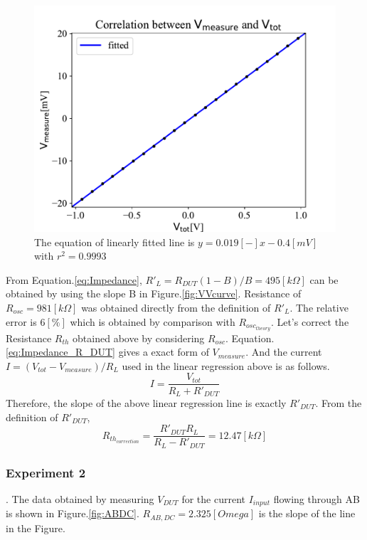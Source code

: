 \documentclass[5p,sort&compress]{elsarticle}
\begin{document}
\begin{figure}[h]
\centering
\includegraphics[width=.5\textwidth]{Impedance_VV.pdf}
\caption{The equation of linearly fitted line is $y = 0.019[-]x - 0.4[mV]$ with $r^2 = 0.9993$}
\label{fig:Impedance_VV}
\end{figure}

From Equation.\ref{eq:Impedance}, $R'_L = R_{DUT}(1-B)/B = 495[k\Omega]$ can be obtained by using the slope B in Figure.\ref{fig:VVcurve}. Resistance of $R_{osc} = 981[k\Omega]$ was obtained directly from the definition of $R'_L$. The relative error is $6[\%]$ which is obtained by comparison with $R_{{osc}_{theory}}$.
Let's correct the Resistance $R_{th}$ obtained above by considering $R_{osc}$. Equation.\ref{eq:Impedance_R_DUT} gives a exact form of $V_{measure}$. And the current $I = (V_{tot}-V_{measure})/R_{L}$ used in the linear regression above is as follows.
\begin{equation}
    I = \frac{V_{tot}}{R_L + R'_{DUT}}
\end{equation}
Therefore, the slope of the above linear regression line is exactly $R'_{DUT}$. From the definition of $R'_{DUT}$,
\begin{equation}
    R_{{th}_{correction}} = \frac{R'_{DUT}R_{L}}{R_L - R'_{DUT}} = 12.47[k\Omega]
\end{equation}


\subsubsection{Experiment 2}.
\newline{}
The data obtained by measuring $V_{DUT}$ for the current $I_{input}$ flowing through AB is shown in Figure.\ref{fig:ABDC}. $R_{AB, DC} = 2.325[Omega]$ is the slope of the line in the Figure.
\end{document}
